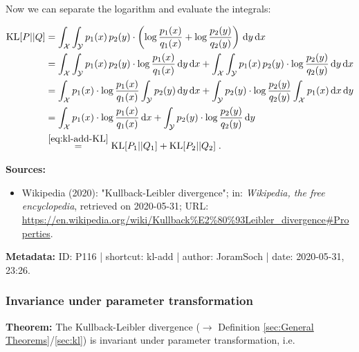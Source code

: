 \documentclass[a4paper,12pt,twoside]{book}
\begin{document}
Now we can separate the logarithm and evaluate the integrals:

\begin{equation} \label{eq:kl-add-KL-qed}
\begin{split}
\mathrm{KL}[P||Q] &= \int_{\mathcal{X}} \int_{\mathcal{Y}} p_1(x) \, p_2(y) \cdot \left( \log \frac{p_1(x)}{q_1(x)} + \log \frac{p_2(y)}{q_2(y)} \right) \, \mathrm{d}y \, \mathrm{d}x \\
&= \int_{\mathcal{X}} \int_{\mathcal{Y}} p_1(x) \, p_2(y) \cdot \log \frac{p_1(x)}{q_1(x)} \, \mathrm{d}y \, \mathrm{d}x + \int_{\mathcal{X}} \int_{\mathcal{Y}} p_1(x) \, p_2(y) \cdot \log \frac{p_2(y)}{q_2(y)} \, \mathrm{d}y \, \mathrm{d}x \\
&= \int_{\mathcal{X}} p_1(x) \cdot \log \frac{p_1(x)}{q_1(x)} \int_{\mathcal{Y}} p_2(y) \, \mathrm{d}y \, \mathrm{d}x + \int_{\mathcal{Y}} p_2(y) \cdot \log \frac{p_2(y)}{q_2(y)} \int_{\mathcal{X}} p_1(x) \, \mathrm{d}x \, \mathrm{d}y \\
&= \int_{\mathcal{X}} p_1(x) \cdot \log \frac{p_1(x)}{q_1(x)} \, \mathrm{d}x + \int_{\mathcal{Y}} p_2(y) \cdot \log \frac{p_2(y)}{q_2(y)} \, \mathrm{d}y \\
&\overset{\eqref{eq:kl-add-KL}}{=} \mathrm{KL}[P_1||Q_1] + \mathrm{KL}[P_2||Q_2] \; .
\end{split}
\end{equation}


\vspace{1em}
\textbf{Sources:}
\begin{itemize}
\item Wikipedia (2020): "Kullback-Leibler divergence"; in: \textit{Wikipedia, the free encyclopedia}, retrieved on 2020-05-31; URL: \url{https://en.wikipedia.org/wiki/Kullback%E2%80%93Leibler_divergence#Properties}.
\end{itemize}


\vspace{1em}
\textbf{Metadata:} ID: P116 | shortcut: kl-add | author: JoramSoch | date: 2020-05-31, 23:26.
\vspace{1em}



\subsubsection[\textbf{Invariance under parameter transformation}]{Invariance under parameter transformation} \label{sec:kl-inv}
\setcounter{equation}{0}

\textbf{Theorem:} The Kullback-Leibler divergence ($\rightarrow$ Definition \ref{sec:General Theorems}/\ref{sec:kl}) is invariant under parameter transformation, i.e.
\end{document}
